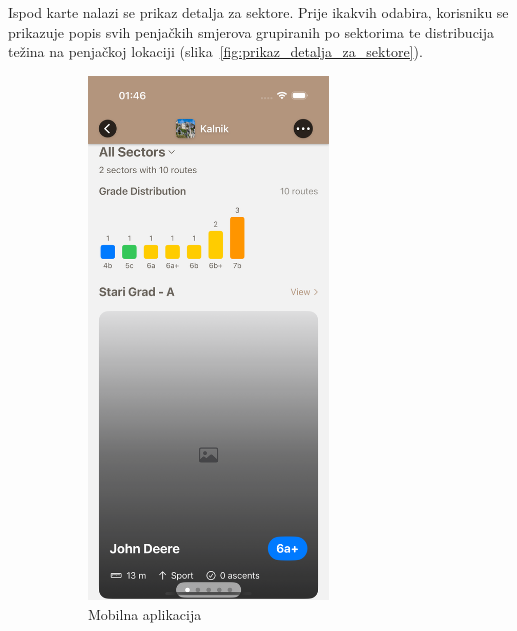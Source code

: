Ispod karte nalazi se prikaz detalja za sektore. Prije ikakvih odabira, korisniku se prikazuje popis svih penjačkih smjerova grupiranih po sektorima te distribucija težina na penjačkoj lokaciji (slika~\ref{fig:prikaz_detalja_za_sektore}). 

\begin{figure}[H]
    \centering
    \begin{subfigure}[b]{0.4\textwidth}
        \centering
        \includegraphics[width=0.7\textwidth]{images/implementacija/crag-details/crag-all-sectors-tabs.png}
        \caption{Mobilna aplikacija}
        \label{fig:prikaz_detalja_za_sektore_mob}
    \end{subfigure}
    \hfill
    \begin{subfigure}[b]{0.55\textwidth}

\end{subfigure}
\end{figure}
